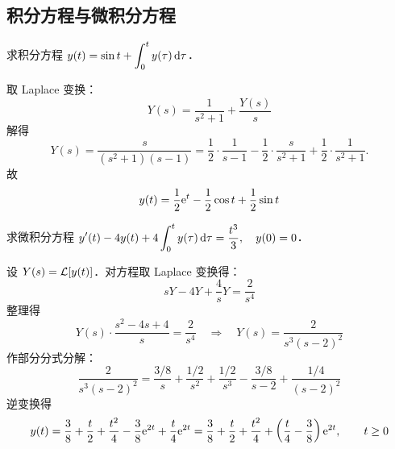 \documentclass[12pt, a4paper, oneside, UTF8]{ctexbook}
\begin{document}
\subsection{积分方程与微积分方程}

\begin{example}
求积分方程 $y(t) = \sin t + \displaystyle\int_0^t y(\tau)\,\mathrm{d}\tau$．
\end{example}
\begin{solution}
取 Laplace 变换：
\[
Y(s) = \frac{1}{s^2+1} + \frac{Y(s)}{s}
\]
解得
\[
Y(s) = \frac{s}{(s^2+1)(s-1)} = \frac{1}{2}\cdot \frac{1}{s-1} - \frac{1}{2}\cdot \frac{s}{s^2+1} + \frac{1}{2}\cdot \frac{1}{s^2+1}.
\]
故
\[
y(t) = \frac{1}{2}\mathrm{e}^{t} - \frac{1}{2}\cos t + \frac{1}{2}\sin t
\]
\end{solution}

\begin{example}
    求微积分方程 $\displaystyle y'(t)-4y(t) +4\int_0^t y(\tau)\,\mathrm{d}\tau = \frac{t^3}{3},\quad y(0)=0$．
\end{example}
\begin{solution}
    设 $Y(s)=\mathcal{L}[y(t)]$．对方程取 Laplace 变换得：
    \[
    sY-4Y+\frac{4}{s}Y=\frac{2}{s^4}
    \]
    整理得
    \[
    Y(s)\cdot\frac{s^2-4s+4}{s}=\frac{2}{s^4}
    \quad\Longrightarrow\quad
    Y(s)=\frac{2}{s^3(s-2)^2}
    \]
    作部分分式分解：
    \[
    \frac{2}{s^3(s-2)^2}
    =\frac{3/8}{s}+\frac{1/2}{s^2}+\frac{1/2}{s^3}-\frac{3/8}{s-2}+\frac{1/4}{(s-2)^2}
    \]
    逆变换得
    \[
    y(t)=\frac{3}{8}+\frac{t}{2}+\frac{t^2}{4}-\frac{3}{8}\mathrm{e}^{2t}+\frac{t}{4}\mathrm{e}^{2t}
    =\frac{3}{8}+\frac{t}{2}+\frac{t^2}{4}+\left(\frac{t}{4}-\frac{3}{8}\right)\mathrm{e}^{2t},\qquad t\ge 0
    \]
\end{solution}



\ifx\allfiles\undefined
\end{document}
